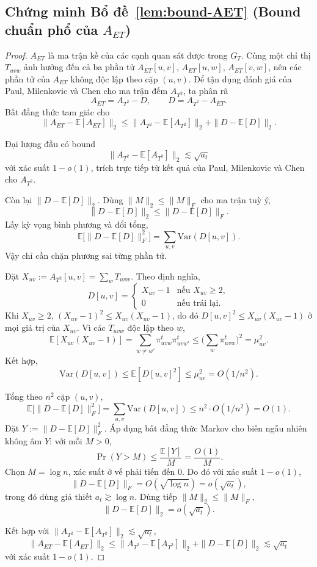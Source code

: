 \subsection*{Chứng minh Bổ đề~\ref{lem:bound-AET} (Bound chuẩn phổ của $A_{ET}$)}

\begin{proof}
$A_{ET}$ là ma trận kề của các cạnh quan sát được trong $G_T$. Cùng một chỉ thị $T_{uvw}$ ảnh hưởng đến cả ba phần tử $A_{ET}[u, v]$, $A_{ET}[u, w]$, $A_{ET}[v, w]$, nên các phần tử của $A_{ET}$ không độc lập theo cặp $(u, v)$. Để tận dụng đánh giá của Paul, Milenkovic và Chen \cite{paul2023hosc} cho ma trận đếm $A_{T^2}$, ta phân rã
\[
    A_{ET} = A_{T^2} - D, \qquad D = A_{T^2} - A_{ET}.
\]
Bất đẳng thức tam giác cho
\[
    \|A_{ET} - \mathbb{E}[A_{ET}]\|_2
        \leq \|A_{T^2} - \mathbb{E}[A_{T^2}]\|_2 + \|D - \mathbb{E}[D]\|_2.
\]

Đại lượng đầu có bound
\[
    \|A_{T^2} - \mathbb{E}[A_{T^2}]\|_2 \lesssim \sqrt{a_t}
\]
với xác suất $1 - o(1)$, trích trực tiếp từ kết quả của Paul, Milenkovic và Chen \cite{paul2023hosc} cho $A_{T^2}$.

Còn lại $\|D - \mathbb{E}[D]\|_2$. Dùng $\|M\|_2 \leq \|M\|_F$ cho ma trận tuỳ ý,
\[
    \|D - \mathbb{E}[D]\|_2 \leq \|D - \mathbb{E}[D]\|_F.
\]
Lấy kỳ vọng bình phương và đổi tổng,
\[
    \mathbb{E}\big[\|D - \mathbb{E}[D]\|_F^2\big] = \sum_{u, v} \mathrm{Var}(D[u, v]).
\]
Vậy chỉ cần chặn phương sai từng phần tử.

Đặt $X_{uv} := A_{T^2}[u, v] = \sum_w T_{uvw}$. Theo định nghĩa,
\[
    D[u, v] = \begin{cases}
        X_{uv} - 1 & \text{nếu } X_{uv} \geq 2, \\
        0 & \text{nếu trái lại}.
    \end{cases}
\]
Khi $X_{uv} \geq 2$, $(X_{uv} - 1)^2 \leq X_{uv}(X_{uv} - 1)$, do đó $D[u, v]^2 \leq X_{uv}(X_{uv} - 1)$ ở mọi giá trị của $X_{uv}$. Vì các $T_{uvw}$ độc lập theo $w$,
\[
    \mathbb{E}[X_{uv}(X_{uv} - 1)] = \sum_{w \neq w'} \pi^t_{uvw} \pi^t_{uvw'} \leq \Big(\sum_w \pi^t_{uvw}\Big)^2 = \mu_{uv}^2.
\]
Kết hợp,
\[
    \mathrm{Var}(D[u, v]) \leq \mathbb{E}[D[u, v]^2] \leq \mu_{uv}^2 = O(1/n^2).
\]

Tổng theo $n^2$ cặp $(u, v)$,
\[
    \mathbb{E}\big[\|D - \mathbb{E}[D]\|_F^2\big] = \sum_{u, v} \mathrm{Var}(D[u, v]) \leq n^2 \cdot O(1/n^2) = O(1).
\]
Đặt $Y := \|D - \mathbb{E}[D]\|_F^2$. Áp dụng bất đẳng thức Markov cho biến ngẫu nhiên không âm $Y$: với mỗi $M > 0$,
\[
    \Pr(Y > M) \leq \frac{\mathbb{E}[Y]}{M} = \frac{O(1)}{M}.
\]
Chọn $M = \log n$, xác suất ở vế phải tiến đến $0$. Do đó với xác suất $1 - o(1)$,
\[
    \|D - \mathbb{E}[D]\|_F = O(\sqrt{\log n}) = o(\sqrt{a_t}),
\]
trong đó dùng giả thiết $a_t \gtrsim \log n$. Dùng tiếp $\|M\|_2 \leq \|M\|_F$,
\[
    \|D - \mathbb{E}[D]\|_2 = o(\sqrt{a_t}).
\]

Kết hợp với $\|A_{T^2} - \mathbb{E}[A_{T^2}]\|_2 \lesssim \sqrt{a_t}$,
\[
    \|A_{ET} - \mathbb{E}[A_{ET}]\|_2 \leq \|A_{T^2} - \mathbb{E}[A_{T^2}]\|_2 + \|D - \mathbb{E}[D]\|_2 \lesssim \sqrt{a_t}
\]
với xác suất $1 - o(1)$.
\end{proof}

